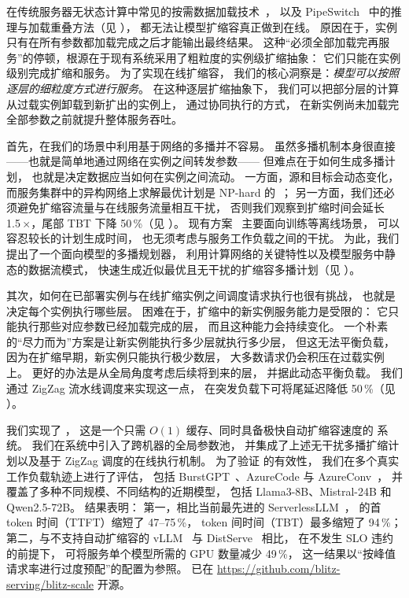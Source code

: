 在传统服务器无状态计算中常见的按需数据加载技术~\cite{mitosis,DBLP:conf/eurosys/WangHW19,DBLP:conf/sosp/HuangZMLLCJLSZL24}，
以及 PipeSwitch~\cite{pipeswitch} 中的推理与加载重叠方法（见 \textsection{\ref{sec:overview}}），
都无法让模型扩缩容真正做到在线。
原因在于，实例只有在所有参数都加载完成之后才能输出最终结果。
这种“必须全部加载完再服务”的停顿，根源在于现有系统采用了粗粒度的实例级扩缩抽象：
它们只能在实例级别完成扩缩和服务。
为了实现在线扩缩容，
我们的核心洞察是：\emph{模型可以按照逐层的细粒度方式进行服务}。
在这种逐层扩缩抽象下，
我们可以把部分层的计算从过载实例卸载到新扩出的实例上，
通过协同执行的方式，
在新实例尚未加载完全部参数之前就提升整体服务吞吐。

首先，在我们的场景中利用基于网络的多播并不容易。
虽然多播机制本身很直接——也就是简单地通过网络在实例之间转发参数——
但难点在于如何生成多播计划，
也就是决定数据应当如何在实例之间流动。
一方面，源和目标会动态变化，
而服务集群中的异构网络上求解最优计划是 NP-hard 的~\cite{DBLP:journals/jpdc/BhatRP03}；
另一方面，我们还必须避免扩缩容流量与在线服务流量相互干扰，
否则我们观察到扩缩时间会延长 1.5\,$\times$，尾部 TBT 下降 50\,\%（见 \textsection{\ref{sec:overview}}）。
现有方案~\cite{DBLP:conf/asplos/CowanMMSX23,DBLP:conf/ppopp/CaiLMMMNS21,DBLP:conf/sc/GhazimirsaeedZR20}
主要面向训练等离线场景，
可以容忍较长的计划生成时间，
也无须考虑与服务工作负载之间的干扰。
为此，我们提出了一个面向模型的多播规划器，
利用计算网络的关键特性以及模型服务中静态的数据流模式，
快速生成近似最优且无干扰的扩缩容多播计划（见 \textsection{\ref{sec:design-plan}}）。

其次，如何在已部署实例与在线扩缩实例之间调度请求执行也很有挑战，
也就是决定每个实例执行哪些层。
困难在于，扩缩中的新实例服务能力是受限的：
它只能执行那些对应参数已经加载完成的层，
而且这种能力会持续变化。
一个朴素的“尽力而为”方案是让新实例能执行多少层就执行多少层，
但这无法平衡负载，
因为在扩缩早期，新实例只能执行极少数层，
大多数请求仍会积压在过载实例上。
更好的办法是从全局角度考虑后续将到来的层，
并据此动态平衡负载。
我们通过 ZigZag 流水线调度来实现这一点，
在突发负载下可将尾延迟降低 50\,\%（见 \textsection{\ref{sec:design-pp}}）。

我们实现了 {\sys}，
这是一个只需 $O(1)$ 缓存、同时具备极快自动扩缩容速度的 {\maas} 系统。
我们在系统中引入了跨机器的全局参数池，
并集成了上述无干扰多播扩缩计划以及基于 ZigZag 调度的在线执行机制。
为了验证 {\sys} 的有效性，
我们在多个真实工作负载轨迹上进行了评估，
包括 BurstGPT~\cite{wang2024burstgpt}、AzureCode 与 AzureConv~\cite{AzurePublicDataset}，
并覆盖了多种不同规模、不同结构的近期模型，
包括 Llama3-8B、Mistral-24B 和 Qwen2.5-72B。
结果表明：
第一，相比当前最先进的 ServerlessLLM~\cite{DBLP:journals/corr/abs-2401-14351}，
{\sys} 的首 token 时间（TTFT）缩短了 47--75\,\%，
token 间时间（TBT）最多缩短了 94\,\%；
第二，与不支持自动扩缩容的 vLLM~\cite{vllm} 与 DistServe~\cite{DBLP:conf/osdi/ZhongLCHZL0024} 相比，
在不发生 SLO 违约的前提下，
{\sys} 可将服务单个模型所需的 GPU 数量减少 49\,\%，
这一结果以“按峰值请求率进行过度预配”的配置为参照。
{\sys} 已在 \url{https://github.com/blitz-serving/blitz-scale} 开源。
